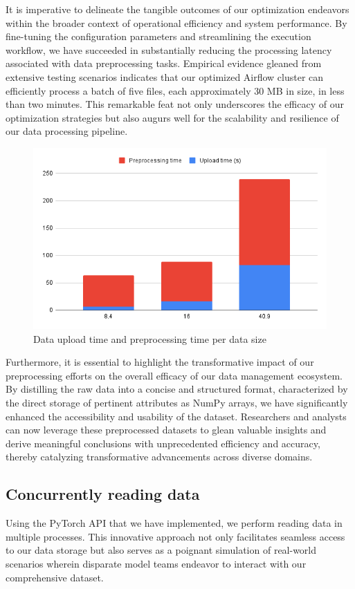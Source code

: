 It is imperative to delineate the tangible outcomes of our optimization
endeavors within the broader context of operational efficiency and system
performance. By fine-tuning the configuration parameters and streamlining the
execution workflow, we have succeeded in substantially reducing the processing
latency associated with data preprocessing tasks. Empirical evidence gleaned
from extensive testing scenarios indicates that our optimized Airflow cluster
can efficiently process a batch of five files, each approximately 30 MB in size,
in less than two minutes. This remarkable feat not only underscores the efficacy
of our optimization strategies but also augurs well for the scalability and
resilience of our data processing pipeline.

\begin{figure}[H]
    \centering
    \includegraphics[width=0.8\linewidth]{Images/5-perf-chart.png}
    \vspace{1cm}
    \caption{Data upload time and preprocessing time per data size}
    \label{fig:perf-chart}
\end{figure}

Furthermore, it is essential to highlight the transformative impact of our
preprocessing efforts on the overall efficacy of our data management ecosystem.
By distilling the raw data into a concise and structured format, characterized
by the direct storage of pertinent attributes as NumPy arrays, we have
significantly enhanced the accessibility and usability of the dataset.
Researchers and analysts can now leverage these preprocessed datasets to glean
valuable insights and derive meaningful conclusions with unprecedented
efficiency and accuracy, thereby catalyzing transformative advancements across
diverse domains.


\subsection{Concurrently reading data}
Using the PyTorch API that we have implemented, we perform reading data in
multiple processes. This innovative approach not only facilitates seamless
access to our data storage but also serves as a poignant simulation of
real-world scenarios wherein disparate model teams endeavor to interact with our
comprehensive dataset.

